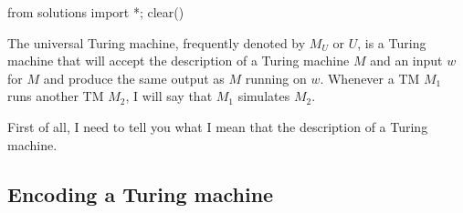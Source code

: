 \begin{python0}
from solutions import *; clear()
\end{python0}

The universal Turing machine, frequently denoted by
$M_U$ or $U$, is a Turing machine that
will accept the description of a Turing machine $M$ and an input $w$
for $M$ and produce the same output as $M$ running on $w$.
Whenever a TM $M_1$ runs another TM $M_2$, I will say that $M_1$
simulates $M_2$.

First of all, I need to tell you what I mean that
the description of a Turing machine.

\subsection{Encoding a Turing machine}

